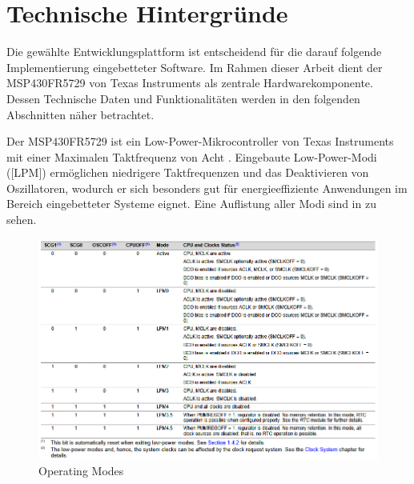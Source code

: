 
\chapter{Technische Hintergr\"unde}
\label{sec:UeberblickEntwicklungsplattform}

Die gew\"ahlte Entwicklungsplattform ist entscheidend f\"ur die darauf folgende Implementierung eingebetteter Software. Im Rahmen dieser Arbeit dient der MSP430FR5729 von Texas Instruments als zentrale Hardwarekomponente. Dessen Technische Daten und Funktionalit\"aten werden in den folgenden Abschnitten n\"aher betrachtet.

Der MSP430FR5729 ist ein Low-Power-Mikrocontroller   von Texas Instruments mit einer Maximalen Taktfrequenz von Acht . Eingebaute Low-Power-Modi ([LPM]) erm\"oglichen \ua niedrigere Taktfrequenzen und das Deaktivieren von Oszillatoren, wodurch er sich besonders gut f\"ur energieeffiziente Anwendungen im Bereich eingebetteter Systeme eignet. Eine Auflistung aller Modi sind in  zu sehen. 

\begin{figure}[h!]
	\centering
	\includegraphics[width=1.0\textwidth]{../Bilder/Operating_Modes.png}
	\caption{Operating Modes }
	\label{fig:operation_modes}
\end{figure}

